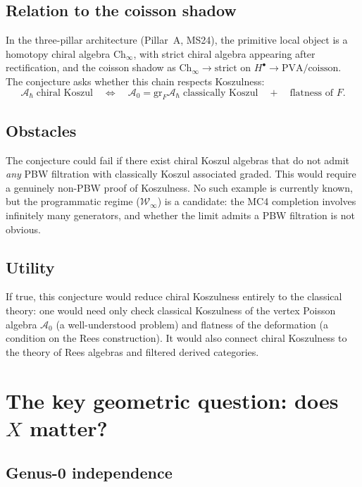 \documentclass[11pt]{article}
\newcommand{\cA}{\mathcal{A}}
\newcommand{\gr}{\mathrm{gr}}
\theoremstyle{plain}
\theoremstyle{definition}
\theoremstyle{remark}
\begin{document}
\subsection{Relation to the coisson shadow}

In the three-pillar architecture (Pillar~A, MS24), the primitive
local object is a homotopy chiral algebra $\mathrm{Ch}_\infty$,
with strict chiral algebra appearing after rectification, and the
coisson shadow as $\mathrm{Ch}_\infty \to \text{strict on }
H^\bullet \to \text{PVA/coisson}$.  The conjecture asks whether
this chain respects Koszulness:
\[
\cA_\hbar \;\text{chiral Koszul}
\quad\Longleftrightarrow\quad
\cA_0 = \gr_F \cA_\hbar \;\text{classically Koszul}
\quad+\quad
\text{flatness of } F.
\]

\subsection{Obstacles}

The conjecture could fail if there exist chiral Koszul algebras
that do not admit \emph{any} PBW filtration with classically Koszul
associated graded.  This would require a genuinely non-PBW proof
of Koszulness.  No such example is currently known, but the
programmatic regime ($\mathcal{W}_\infty$) is a candidate: the
MC4 completion involves infinitely many generators, and whether
the limit admits a PBW filtration is not obvious.

\subsection{Utility}

If true, this conjecture would reduce chiral Koszulness entirely
to the classical theory: one would need only check classical
Koszulness of the vertex Poisson algebra $\cA_0$ (a well-understood
problem) and flatness of the deformation (a condition on the
Rees construction).  It would also connect chiral Koszulness to
the theory of Rees algebras and filtered derived categories.


\section{The key geometric question: does $X$ matter?}
\label{sec:curve-dependence}

\subsection{Genus-0 independence}
\end{document}
